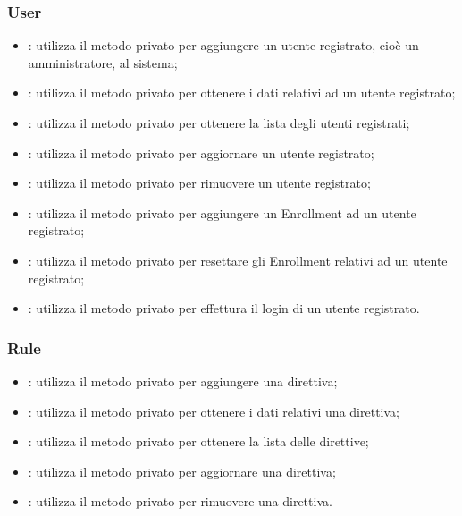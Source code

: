 \subsubsection{User}
\begin{itemize}
\item {}: utilizza il metodo privato  per aggiungere un utente registrato, cioè un amministratore, al sistema;

\item {}: utilizza il metodo privato  per ottenere i dati relativi ad un utente registrato;

\item {}: utilizza il metodo privato  per ottenere la lista degli utenti registrati;

\item {}: utilizza il metodo privato  per aggiornare un utente registrato;

\item {}: utilizza il metodo privato  per rimuovere un utente registrato;

\item {}: utilizza il metodo privato  per aggiungere un Enrollment ad un utente registrato;

\item {}: utilizza il metodo privato  per resettare gli Enrollment relativi ad un utente registrato;

\item {}: utilizza il metodo privato  per effettura il login di un utente registrato.

\end{itemize}
\subsubsection{Rule}
\begin{itemize}
\item {}: utilizza il metodo privato  per aggiungere una direttiva;

\item {}: utilizza il metodo privato  per ottenere i dati relativi una direttiva;

\item {}: utilizza il metodo privato  per ottenere la lista delle direttive;

\item {}: utilizza il metodo privato  per aggiornare una direttiva;

\item {}: utilizza il metodo privato  per rimuovere una direttiva.


\end{itemize}
